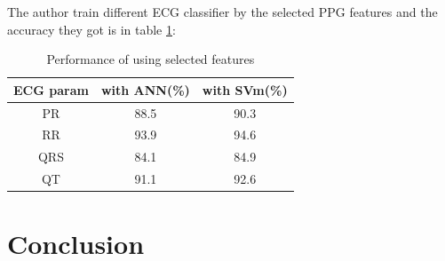 \documentclass[a4paper,12pt]{article}
\begin{document}
The author train different ECG classifier by the selected PPG features and the accuracy they got is in table \ref{tab:perfoemance_ppges}:

\begin{table}[]
    \centering
    \begin{tabular}{c|c|c}
         ECG param& with ANN(\%) & with SVm(\%) \\
    \hline
         PR & 88.5 & 90.3 \\
         RR & 93.9 & 94.6 \\
         QRS & 84.1 & 84.9 \\
         QT & 91.1 & 92.6 
    \end{tabular}
    \caption{Performance of using selected features\autocite{Banerjee:2013estimation}}
    \label{tab:perfoemance_ppges}
\end{table}

\section{Conclusion}

\printbibliography
\end{document}
